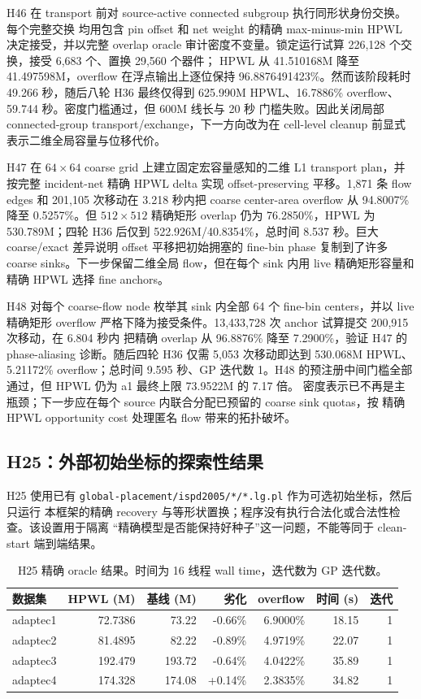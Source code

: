 \documentclass[UTF8,a4paper,11pt]{ctexart}
\begin{document}
H46 在 transport 前对 source-active connected subgroup 执行同形状身份交换。每个完整交换
均用包含 pin offset 和 net weight 的精确 max-minus-min HPWL 决定接受，并以完整 overlap
oracle 审计密度不变量。锁定运行试算 226,128 个交换，接受 6,683 个、置换 29,560 个器件；
HPWL 从 41.510168M 降至 41.497598M，overflow 在浮点输出上逐位保持
96.8876491423\%。然而该阶段耗时 49.266 秒，随后八轮 H36 最终仅得到
625.990M HPWL、16.7886\% overflow、59.744 秒。密度门槛通过，但 600M 线长与 20 秒
门槛失败。因此关闭局部 connected-group transport/exchange，下一方向改为在 cell-level
cleanup 前显式表示二维全局容量与位移代价。

H47 在 $64\times64$ coarse grid 上建立固定宏容量感知的二维 L1 transport plan，并按完整
incident-net 精确 HPWL delta 实现 offset-preserving 平移。1,871 条 flow edges 和 201,105
次移动在 3.218 秒内把 coarse center-area overflow 从 94.8007\% 降至 0.5257\%。但
$512\times512$ 精确矩形 overlap 仍为 76.2850\%，HPWL 为 530.789M；四轮 H36 后仅到
522.926M/40.8354\%，总时间 8.537 秒。巨大 coarse/exact 差异说明 offset 平移把初始拥塞的
fine-bin phase 复制到了许多 coarse sinks。下一步保留二维全局 flow，但在每个 sink 内用 live
精确矩形容量和精确 HPWL 选择 fine anchors。

H48 对每个 coarse-flow node 枚举其 sink 内全部 64 个 fine-bin centers，并以 live 精确矩形
overflow 严格下降为接受条件。13,433,728 次 anchor 试算提交 200,915 次移动，在 6.804 秒内
把精确 overlap 从 96.8876\% 降至 7.2900\%，验证 H47 的 phase-aliasing 诊断。随后四轮
H36 仅需 5,053 次移动即达到 530.068M HPWL、5.21172\% overflow；总时间 9.595 秒、GP
迭代数 1。H48 的预注册中间门槛全部通过，但 HPWL 仍为 a1 最终上限 73.9522M 的 7.17 倍。
密度表示已不再是主瓶颈；下一步应在每个 source 内联合分配已预留的 coarse sink quotas，按
精确 HPWL opportunity cost 处理匿名 flow 带来的拓扑破坏。

\subsection{H25：外部初始坐标的探索性结果}
H25 使用已有 \texttt{global-placement/ispd2005/*/*.lg.pl} 作为可选初始坐标，然后只运行
本框架的精确 recovery 与等形状置换；程序没有执行合法化或合法性检查。该设置用于隔离
“精确模型是否能保持好种子”这一问题，不能等同于 clean-start 端到端结果。

\begin{table}[H]
\centering
\caption{H25 精确 oracle 结果。时间为 16 线程 wall time，迭代数为 GP 迭代数。}
\begin{tabular}{lrrrrrr}
\toprule
数据集 & HPWL (M) & 基线 (M) & 劣化 & overflow & 时间 (s) & 迭代 \\
\midrule
adaptec1 & 72.7386 & 73.22 & -0.66\% & 6.9000\% & 18.15 & 1 \\
adaptec2 & 81.4895 & 82.22 & -0.89\% & 4.9719\% & 22.07 & 1 \\
adaptec3 & 192.479 & 193.72 & -0.64\% & 4.0422\% & 35.89 & 1 \\
adaptec4 & 174.328 & 174.08 & +0.14\% & 2.3835\% & 34.82 & 1 \\
\bottomrule
\end{tabular}
\end{table}
\end{document}
